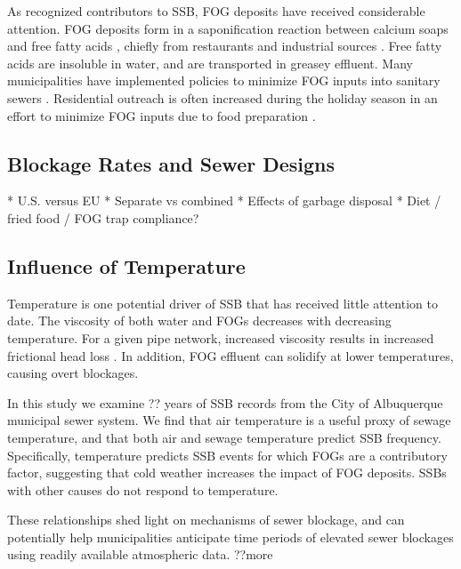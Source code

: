 \documentclass[letterpaper,12pt]{article}
\begin{document}
As recognized contributors to SSB, FOG deposits have received considerable
attention. FOG deposits form in a saponification reaction between calcium soaps
and free fatty acids \cite{He2011}, chiefly from restaurants and
industrial sources \cite{Keener2008}.  Free fatty acids are insoluble in
water, and are transported in greasey effluent.  Many municipalities have
implemented policies to minimize FOG inputs into sanitary sewers
\cite{hassey2001grease, heckler2003best, parnell2005innovative,
bennett2006atlanta, tupper2008fog}.  Residential outreach is often increased
during the holiday season in an effort to minimize FOG inputs due to food
preparation \cite{tupper2008fog}.

\subsection*{Blockage Rates and Sewer Designs}
* U.S. versus EU
* Separate vs combined
* Effects of garbage disposal
* Diet / fried food / FOG trap compliance?

\subsection*{Influence of Temperature}
Temperature is one potential driver of SSB that has received little attention to
date. The viscosity of both water and FOGs decreases with decreasing
temperature. For a given pipe network, increased viscosity results in increased
frictional head loss \cite{romeo2002improved}. In addition, FOG effluent
can solidify at lower temperatures, causing overt blockages.

In this study we examine ?? years of SSB records from the City of Albuquerque
municipal sewer system.  We find that air temperature is
a useful proxy of sewage temperature, and that both air and sewage temperature
predict SSB frequency. Specifically, temperature predicts SSB events for which
FOGs are a contributory factor, suggesting that cold weather increases the impact of FOG deposits. SSBs with other causes do not respond to temperature. 

These relationships shed light on mechanisms
of sewer blockage, and can potentially help municipalities anticipate time
periods of elevated sewer blockages using readily available atmospheric data.
??more



\end{document}
